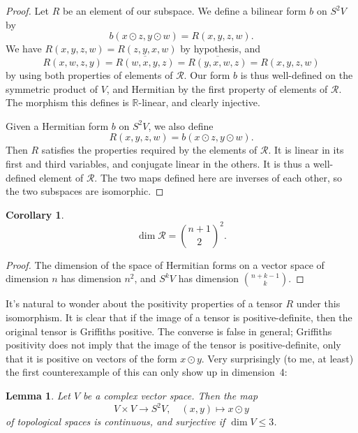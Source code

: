 \documentclass[11pt]{article}
\newtheorem{lemm}[theo]{Lemma}
\newtheorem{coro}[theo]{Corollary}
\newtheorem*{proof}{Proof}
\newcommand{\kk}[1]{\mathbb{#1}}
\newcommand{\cc}[1]{\mathcal{#1}}
\begin{document}
\begin{proof}
Let $R$ be an element of our subspace. We define a bilinear form $b$ on $S^2 V$ by
$$
b(x \odot z, y \odot w)
= R(x, y, z, w).
$$
We have $R(x,y,z,w) = R(z,y,x,w)$ by hypothesis, and
$$
R(x,w,z,y)
= \overline{R(w,x,y,z)}
= \overline{R(y,x,w,z)}
= R(x,y,z,w)
$$
by using both properties of elements of $\cc R$. Our form $b$ is thus well-defined on the symmetric product of $V$, and Hermitian by the first property of elements of $\cc R$. The morphism this defines is $\kk R$-linear, and clearly injective.

Given a Hermitian form $b$ on $S^2V$, we also define
$$
R(x,y,z,w) = b(x \odot z, y \odot w).
$$
Then $R$ satisfies the properties required by the elements of $\cc R$. It is linear in its first and third variables, and conjugate linear in the others. It is thus a well-defined element of $\cc R$. The two maps defined here are inverses of each other, so the two subspaces are isomorphic.
\end{proof}


\begin{coro}
$$
\dim \cc R
= \binom{n+1}{2}^2.
$$
\end{coro}


\begin{proof}
The dimension of the space of Hermitian forms on a vector space of dimension $n$ has dimension $n^2$, and $S^k V$ has dimension $\binom{n + k - 1}{k}$.
\end{proof}


It's natural to wonder about the positivity properties of a tensor $R$ under this isomorphism. It is clear that if the image of a tensor is positive-definite, then the original tensor is Griffiths positive. The converse is false in general; Griffiths positivity does not imply that the image of the tensor is positive-definite, only that it is positive on vectors of the form $x \odot y$. Very surprisingly (to me, at least) the first counterexample of this can only show up in dimension~4:



\begin{lemm}
Let $V$ be a complex vector space. Then the map
$$
V \times V \to S^2 V,
\quad
(x, y) \mapsto x \odot y
$$
of topological spaces is continuous, and surjective if $\dim V \leq 3$.
\end{lemm}
\end{document}
